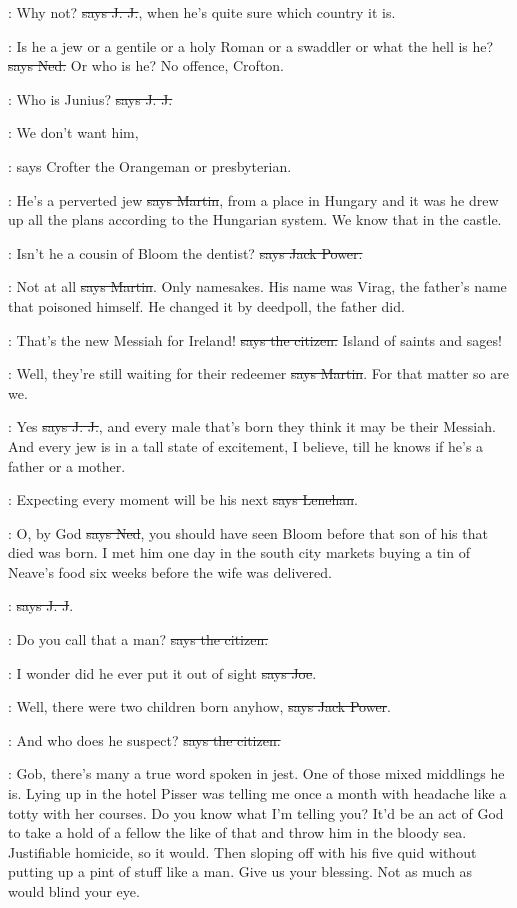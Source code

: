 \jjom:
Why not? \sout{says J. J.},
when he's quite sure which country it is.

\lambert:
Is he a jew or a gentile or a holy Roman
or a swaddler or what the hell
is he? \sout{says Ned.} Or who is he? No offence, Crofton.

\jjom:
Who is Junius? \sout{says J. J.}

\crofton:
We don't want him,

\Nq:
says Crofter the Orangeman or presbyterian.

\cunningham:
He's a perverted jew \sout{says Martin},
from a place in Hungary and it was he
drew up all the plans according to the Hungarian system. We know that in
the castle.

\power:
Isn't he a cousin of Bloom the dentist?
\sout{says Jack Power.}

\cunningham:
Not at all \sout{says Martin}.
Only namesakes. His name was Virag, the
father's name that poisoned himself. He changed it by deedpoll, the father
did.

\citizen:
That's the new Messiah for Ireland!
\sout{says the citizen.}
Island of saints and sages!

\cunningham:
Well, they're still waiting for their redeemer
\sout{says Martin}. For that
matter so are we.

\jjom:
Yes \sout{says J. J.},
and every male that's born they think it may be their
Messiah. And every jew is in a tall state of excitement, I believe, till
he knows if he's a father or a mother.

\lenehan:
Expecting every moment will be his next
\sout{says Lenehan}.

\lambert:
O, by God \sout{says Ned},
you should have seen Bloom before that son of his
that died was born. I met him one day in the south city markets buying a
tin of Neave's food six weeks before the wife was delivered.

\jjom:
 \sout{says J. J}.

\citizen:
Do you call that a man?
\sout{says the citizen.}

\joe:
I wonder did he ever put it out of sight
\sout{says Joe}.

\power:
Well, there were two children born anyhow,
\sout{says Jack Power}.

\citizen:
And who does he suspect?
\sout{says the citizen.}

\Nq:
Gob, there's many a true word spoken in jest. One of those mixed
middlings he is. Lying up in the hotel Pisser was telling me once a month
with headache like a totty with her courses. Do you know what I'm telling
you? It'd be an act of God to take a hold of a fellow the like of that and
throw him in the bloody sea. Justifiable homicide, so it would. Then
sloping off with his five quid without putting up a pint of stuff like a
man. Give us your blessing. Not as much as would blind your eye.

